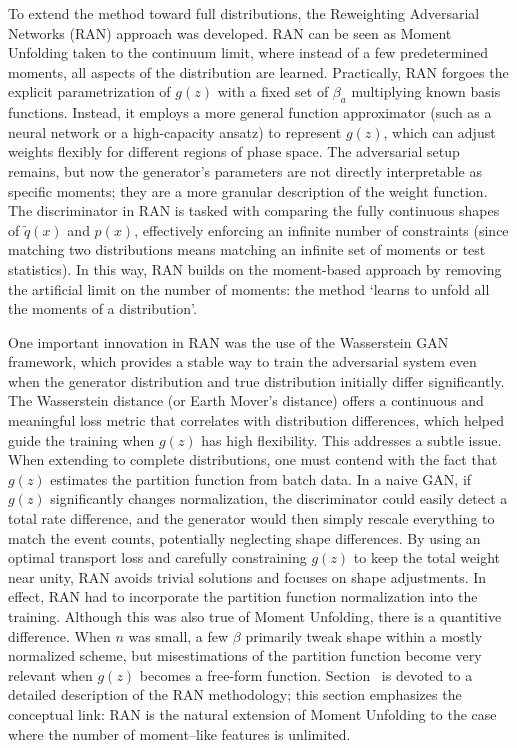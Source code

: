         To extend the method toward full distributions, the Reweighting Adversarial Networks (RAN) approach was developed.\kd{}
        RAN can be seen as Moment Unfolding taken to the continuum limit, where instead of a few predetermined moments, all aspects of the distribution are learned. Practically, RAN forgoes the explicit parametrization of $g(z)$ with a fixed set of $\beta_a$ multiplying known basis functions.
        Instead, it employs a more general function approximator (such as a neural network or a high-capacity ansatz) to represent $g(z)$, which can adjust weights flexibly for different regions of phase space.
        The adversarial setup remains, but now the generator’s parameters are not directly interpretable as specific moments;
        they are a more granular description of the weight function.
        The discriminator in RAN is tasked with comparing the fully continuous shapes of $\tilde{q}(x)$ and $p(x)$, effectively enforcing an infinite number of constraints (since matching two distributions means matching an infinite set of moments or test statistics). In this way, RAN builds on the moment-based approach by removing the artificial limit on the number of moments: the method `learns to unfold all the moments of a distribution'. \kd{}

        One important innovation in RAN was the use of the Wasserstein GAN framework,\kd{} which provides a stable way to train the adversarial system even when the generator distribution and true distribution initially differ significantly.
        The Wasserstein distance (or Earth Mover’s distance) offers a continuous and meaningful loss metric that correlates with distribution differences, which helped guide the training when $g(z)$ has high flexibility.
        This addresses a subtle issue.
        When extending to complete distributions, one must contend with the fact that $g(z)$ estimates the partition function from batch data.
        In a naive GAN, if $g(z)$ significantly changes normalization, the discriminator could easily detect a total rate difference, and the generator would then simply rescale everything to match the event counts, potentially neglecting shape differences.
        By using an optimal transport loss and carefully constraining $g(z)$ to keep the total weight near unity, RAN avoids trivial solutions and focuses on shape adjustments.
        In effect, RAN had to incorporate the partition function normalization into the training.
        Although this was also true of Moment Unfolding, there is a quantitive difference.
        When $n$ was small, a few $\beta$ primarily tweak shape within a mostly normalized scheme, but misestimations of the partition function become very relevant when $g(z)$ becomes a free-form function.\kd{}
        Section~ is devoted to a detailed description of the RAN methodology; this section emphasizes the conceptual link: RAN is the natural extension of Moment Unfolding to the case where the number of moment--like features is unlimited.

